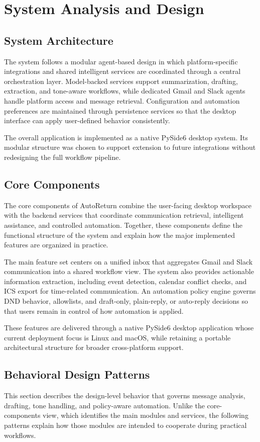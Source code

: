 \chapter{System Analysis and Design}
\label{sec:system_design}

\section{System Architecture}
The system follows a modular agent-based design in which platform-specific integrations and shared intelligent services are coordinated through a central orchestration layer. Model-backed services support summarization, drafting, extraction, and tone-aware workflows, while dedicated Gmail and Slack agents handle platform access and message retrieval. Configuration and automation preferences are maintained through persistence services so that the desktop interface can apply user-defined behavior consistently.

The overall application is implemented as a native PySide6 desktop system. Its modular structure was chosen to support extension to future integrations without redesigning the full workflow pipeline.

\section{Core Components}
\noindent The core components of AutoReturn combine the user-facing desktop workspace with the backend services that coordinate communication retrieval, intelligent assistance, and controlled automation. Together, these components define the functional structure of the system and explain how the major implemented features are organized in practice.

The main feature set centers on a unified inbox that aggregates Gmail and Slack communication into a shared workflow view. The system also provides actionable information extraction, including event detection, calendar conflict checks, and ICS export for time-related communication. An automation policy engine governs DND behavior, allowlists, and draft-only, plain-reply, or auto-reply decisions so that users remain in control of how automation is applied.

These features are delivered through a native PySide6 desktop application whose current deployment focus is Linux and macOS, while retaining a portable architectural structure for broader cross-platform support.

\section{Behavioral Design Patterns}
This section describes the design-level behavior that governs message analysis, drafting, tone handling, and policy-aware automation. Unlike the core-components view, which identifies the main modules and services, the following patterns explain how those modules are intended to cooperate during practical workflows.

